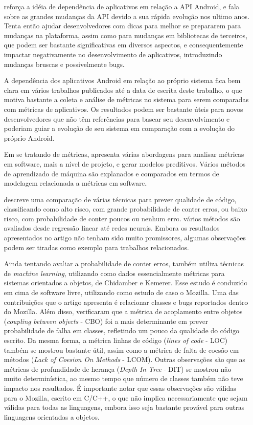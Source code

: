  reforça a idéia de dependência de aplicativos em relação a API Android, e fala sobre as grandes mudanças da API devido a sua rápida evolução nos ultimo anos. Tenta então ajudar desenvolvedores com dicas para melhor se prepararem para mudanças na plataforma, assim como para mudanças em bibliotecas de terceiros, que podem ser bastante significativas em diversos aspectos, e consequentemente impactar negativamente no desenvolvimento de aplicativos, introduzindo mudanças bruscas e possivelmente bugs.

A dependência dos aplicativos Android em relação ao próprio sistema fica bem clara em vários trabalhos publicados até a data de escrita deste trabalho, o que motiva bastante a coleta e análise de métricas no sistema para serem comparadas com métricas de aplicativos. Os resultados podem ser bastante úteis para novos desenvolvedores que não têm referências para basear seu desenvolvimento e poderiam guiar a evolução de seu sistema em comparação com a evolução do próprio Android.

Em se tratando de métricas,  apresenta várias abordagens para analisar métricas em software, mais a nível de projeto, e gerar modelos preditivos. Vários métodos de aprendizado de máquina são explanados e comparados em termos de modelagem relacionada a métricas em software. 

 descreve uma comparação de várias técnicas para prever qualidade de código, classificando como alto risco, com grande probabilidade de conter erros, ou baixo risco, com probabilidade de conter poucos ou nenhum erro. vários métodos são avaliados desde regressão linear até redes neurais. Embora os resultados apresentados no artigo não tenham sido muito promissores, algumas observações podem ser tiradas como exemplo para trabalhos relacionados. 

Ainda tentando avaliar a probabilidade de conter erros,  também utiliza técnicas de \textit{machine learning}, utilizando como dados essencialmente métricas para sistemas orientados a objetos, de Chidamber e Kemerer. Esse estudo é conduzido em cima de software livre, utilizando como estudo de caso o Mozilla. Uma das contribuições que o artigo apresenta é relacionar classes e bugs reportados dentro do Mozilla. Além disso, verificaram que a métrica de acoplamento entre objetos (\textit{coupling between objects} - CBO) foi a mais determinante em prever probabilidade de falha em classes, refletindo um pouco da qualidade do código escrito. Da mesma forma, a métrica linhas de código (\textit{lines of code} - LOC) também se mostrou bastante útil, assim como a métrica de falta de coesão em métodos (\textit{Lack of Coesion On Methods} - LCOM). Outras observações são que as métricas de profundidade de herança (\textit{Depth In Tree} - DIT) se mostrou não muito determinística, ao mesmo tempo que  número de classes também não teve impacto nos resultados. É importante notar que essas observações são válidas para o Mozilla, escrito em C/C++, o que não implica necessariamente que sejam válidas para todas as linguagens, embora isso seja bastante provável para outras linguagens orientadas a objetos.

